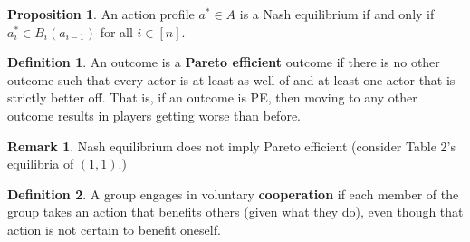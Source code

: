 \documentclass[10pt, oneside]{article}
\theoremstyle{definition}
\newtheorem{defn}{Definition}
\newtheorem{prop}{Proposition}
\newtheorem{rem}{Remark}
\begin{document}
\begin{prop}
    An action profile $a^\ast \in A$ is a Nash equilibrium if and only if $a_i^\ast \in B_i(a_{i-1})$ for all $i \in [n].$
\end{prop}

\begin{defn}
    An outcome is a \textbf{Pareto efficient} outcome if there is no other outcome such that every actor is at least as well of and at least one actor that is strictly better off. That is, if an outcome is PE, then moving to any other outcome results in players getting worse than before.
\end{defn}
\begin{rem}
    Nash equilibrium does not imply Pareto efficient (consider Table 2's equilibria of $(1,1)$.)
\end{rem}
\begin{defn}
    A group engages in voluntary \textbf{cooperation} if each member of the group takes an action that benefits others (given what they do), even though that action is not certain to benefit oneself.
\end{defn}

\newpage
\end{document}
